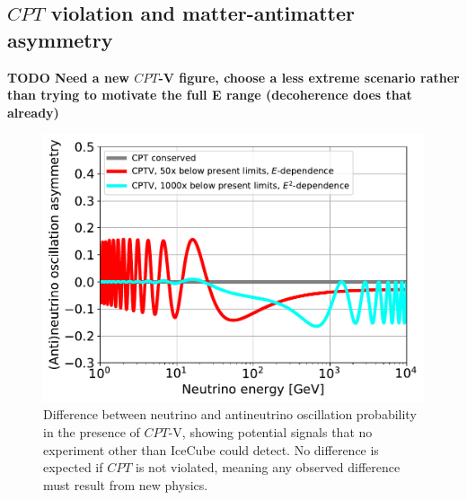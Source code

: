 \documentclass[a4paper,11pt]{article}
\begin{document}


\subsection{$CPT$ violation and matter-antimatter asymmetry}

\textbf{TODO Need a new $CPT$-V figure, choose a less extreme scenario rather than trying to motivate the full E range (decoherence does that already)}

\begin{figure} %
    \centering
    \includegraphics[trim=0.0cm 0.0cm 0.cm 0.0cm, clip=true, width=1.\linewidth]{images/CPTv_IceCube.pdf}
	\caption{Difference between neutrino and antineutrino oscillation probability in the presence of $CPT$-V, showing potential signals that no experiment other than IceCube could detect. No difference is expected if $CPT$ is not violated, meaning any observed difference must result from new physics. }
	\label{fig:$CPT$v}
\end{figure}
\end{document}
